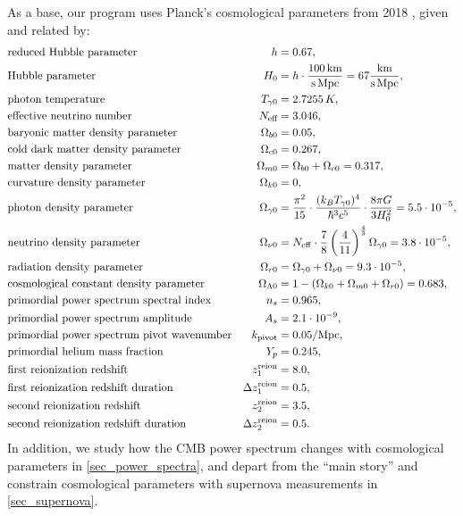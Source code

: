 \documentclass[10pt,a4paper]{article}
\begin{document}
As a base, our program uses Planck's cosmological parameters from 2018 \cite{planckcollaborationPlanck2018Results2020},
given and related by:
\begin{subequations}
\begin{align}
	& \text{reduced Hubble parameter} & h &= 0.67, \\
	& \text{Hubble parameter} & H_0 &= h \cdot \frac{100\,\mathrm{km}}{\mathrm{s}\,\mathrm{Mpc}} = 67 \frac{\mathrm{km}}{\mathrm{s}\,\mathrm{Mpc}}, \\
	& \text{photon temperature} & T_{\gamma0} &= 2.7255\,K, \\
	& \text{effective neutrino number} & N_\text{eff} &= 3.046, \\
	& \text{baryonic matter density parameter} & \Omega_{b0} &= 0.05, \\
	& \text{cold dark matter density parameter} & \Omega_{c0} &= 0.267,\\
	& \text{matter density parameter} & \Omega_{m0} &= \Omega_{b0} + \Omega_{c0} = 0.317, \\
	& \text{curvature density parameter} & \Omega_{k0} &= 0, \\
	& \text{photon density parameter} & \Omega_{\gamma0} &= \frac{\pi^2}{15} \cdot \frac{(k_B T_{\gamma0})^4}{\hbar^3 c^5} \cdot \frac{8 \pi G}{3 H_0^2} = 5.5 \cdot 10^{-5} , \\
	& \text{neutrino density parameter} & \Omega_{\nu0} &= N_{\rm eff}\cdot \frac{7}{8}\left(\frac{4}{11}\right)^{\frac43}\Omega_{\gamma 0} = 3.8 \cdot 10^{-5} , \\
	& \text{radiation density parameter} & \Omega_{r0} &= \Omega_{\gamma0} + \Omega_{\nu0} = 9.3 \cdot 10^{-5}, \\
	& \text{cosmological constant density parameter} & \Omega_{\Lambda 0} &= 1 - (\Omega_{k 0}+\Omega_{m 0}+\Omega_{r0}) = 0.683,\\
	& \text{primordial power spectrum spectral index} & n_s &= 0.965, \\
	& \text{primordial power spectrum amplitude} & A_s &= 2.1\cdot 10^{-9}, \\
	& \text{primordial power spectrum pivot wavenumber} & k_\text{pivot} &= 0.05/\textrm{Mpc}, \\
	& \text{primordial helium mass fraction} & Y_p &= 0.245, \\
	& \text{first reionization redshift} & z^{\rm reion}_1 &= 8.0, \\
	& \text{first reionization redshift duration} & \Delta z^{\rm reion}_1 &= 0.5, \\
	& \text{second reionization redshift} & z^{\rm reion}_2 &= 3.5, \\
	& \text{second reionization redshift duration} & \Delta z^{\rm reion}_2 &= 0.5.
\end{align}
\label{eq_planck2018}
\end{subequations}
In addition,
we study how the CMB power spectrum changes with cosmological parameters in \cref{sec_power_spectra}, 
and depart from the ``main story'' and constrain cosmological parameters with supernova measurements in \cref{sec_supernova}.
\end{document}
